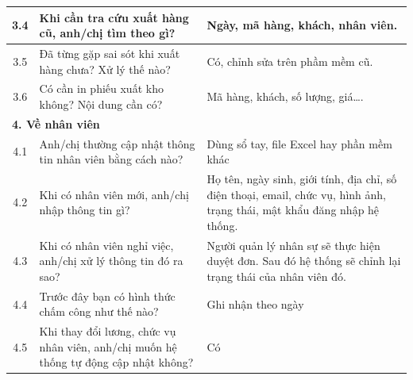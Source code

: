 \documentclass[a4paper,12pt]{report}
\begin{document}
\begin{longtable}{|c|p{8cm}|p{7cm}|}
    \hline
    3.4          & Khi cần tra cứu xuất hàng cũ, anh/chị tìm theo gì?                                                                      & Ngày, mã hàng, khách, nhân viên.                                                                                         \\
    \hline
    3.5          & Đã từng gặp sai sót khi xuất hàng chưa? Xử lý thế nào?                                                                  & Có, chỉnh sửa trên phầm mềm cũ.                                                                                          \\
    \hline
    3.6          & Có cần in phiếu xuất kho không? Nội dung cần có?                                                                        & Mã hàng, khách, số lượng, giá….                                                                                          \\
    \hline
    \multicolumn{3}{|l|}{\textbf{4. Về nhân viên}}                                                                                                                                                                                                                    \\
    \hline
    4.1          & Anh/chị thường cập nhật thông tin nhân viên bằng cách nào?                                                              & Dùng sổ tay, file Excel hay phần mềm khác                                                                                \\
    \hline
    4.2          & Khi có nhân viên mới, anh/chị nhập thông tin gì?                                                                        & Họ tên, ngày sinh, giới tính, địa chỉ, số điện thoại, email, chức vụ, hình ảnh, trạng thái, mật khẩu đăng nhập hệ thống. \\
    \hline
    4.3          & Khi có nhân viên nghỉ việc, anh/chị xử lý thông tin đó ra sao?                                                          & Người quản lý nhân sự sẽ thực hiện duyệt đơn. Sau đó hệ thống sẽ chỉnh lại trạng thái của nhân viên đó.                  \\
    \hline
    4.4          & Trước đây bạn có hình thức chấm công như thế nào?                                                                       & Ghi nhận theo ngày                                                                                                       \\
    \hline
    4.5          & Khi thay đổi lương, chức vụ nhân viên, anh/chị muốn hệ thống tự động cập nhật không?                                    & Có                                                                                                                       \\

\end{longtable}
\end{document}
